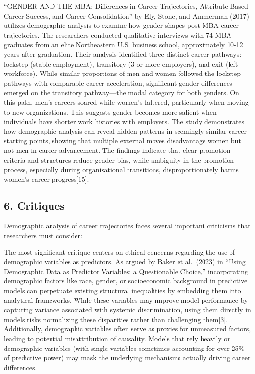 \documentclass[
  letterpaper,
  DIV=11,
  numbers=noendperiod]{scrartcl}
\begin{document}
``GENDER AND THE MBA: Differences in Career Trajectories,
Attribute-Based Career Success, and Career Consolidation'' by Ely,
Stone, and Ammerman (2017) utilizes demographic analysis to examine how
gender shapes post-MBA career trajectories. The researchers conducted
qualitative interviews with 74 MBA graduates from an elite Northeastern
U.S. business school, approximately 10-12 years after graduation. Their
analysis identified three distinct career pathways: lockstep (stable
employment), transitory (3 or more employers), and exit (left
workforce). While similar proportions of men and women followed the
lockstep pathways with comparable career acceleration, significant
gender differences emerged on the transitory pathway---the modal
category for both genders. On this path, men's careers soared while
women's faltered, particularly when moving to new organizations. This
suggests gender becomes more salient when individuals have shorter work
histories with employers. The study demonstrates how demographic
analysis can reveal hidden patterns in seemingly similar career starting
points, showing that multiple external moves disadvantage women but not
men in career advancement. The findings indicate that clear promotion
criteria and structures reduce gender bias, while ambiguity in the
promotion process, especially during organizational transitions,
disproportionately harms women's career progress{[}15{]}.

\subsection{6. Critiques}\label{critiques}

Demographic analysis of career trajectories faces several important
criticisms that researchers must consider:

The most significant critique centers on ethical concerns regarding the
use of demographic variables as predictors. As argued by Baker et
al.~(2023) in ``Using Demographic Data as Predictor Variables: a
Questionable Choice,'' incorporating demographic factors like race,
gender, or socioeconomic background in predictive models can perpetuate
existing structural inequalities by embedding them into analytical
frameworks. While these variables may improve model performance by
capturing variance associated with systemic discrimination, using them
directly in models risks normalizing these disparities rather than
challenging them{[}3{]}. Additionally, demographic variables often serve
as proxies for unmeasured factors, leading to potential misattribution
of causality. Models that rely heavily on demographic variables (with
single variables sometimes accounting for over 25\% of predictive power)
may mask the underlying mechanisms actually driving career differences.
\end{document}
